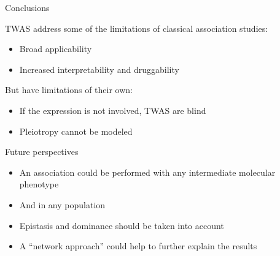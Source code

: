\documentclass[aspectratio=169,12pt]{beamer}
\begin{document}
\begin{frame}{Conclusions}

	TWAS address some of the limitations of classical association 
studies:

	\begin{itemize}
		\item Broad applicability
		\item Increased interpretability and druggability
	\end{itemize}

	But have limitations of their own:

	\begin{itemize}
		\item If the expression is not involved, TWAS are blind
		\item Pleiotropy cannot be modeled
	\end{itemize}

\end{frame}

\begin{frame}{Future perspectives}

	\begin{itemize}
		\item<1-> An association could be performed with any 
intermediate molecular phenotype
		\item<2-> And in any population
		\item<3-> Epistasis and dominance should be taken into account
		\item<4-> A \enquote{network approach} could help to further 
explain the results
	\end{itemize}


\end{frame}

\appendix


\begin{frame}[plain]
	\nocite{*}
	\tiny
	\printbibliography[title=References,keyword=TWAS]
\end{frame}
\end{document}
